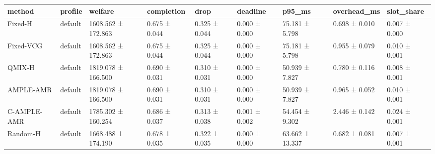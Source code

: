 \begin{tabular}{lllllllll}
\toprule
method & profile & welfare & completion & drop & deadline & p95\_ms & overhead\_ms & slot\_share \\
\midrule
Fixed-H & default & 1608.562 ± 172.863 & 0.675 ± 0.044 & 0.325 ± 0.044 & 0.000 ± 0.000 & 75.181 ± 5.798 & 0.698 ± 0.010 & 0.007 ± 0.000 \\
Fixed-VCG & default & 1608.562 ± 172.863 & 0.675 ± 0.044 & 0.325 ± 0.044 & 0.000 ± 0.000 & 75.181 ± 5.798 & 0.955 ± 0.079 & 0.010 ± 0.001 \\
QMIX-H & default & 1819.078 ± 166.500 & 0.690 ± 0.031 & 0.310 ± 0.031 & 0.000 ± 0.000 & 50.939 ± 7.827 & 0.780 ± 0.116 & 0.008 ± 0.001 \\
AMPLE-AMR & default & 1819.078 ± 166.500 & 0.690 ± 0.031 & 0.310 ± 0.031 & 0.000 ± 0.000 & 50.939 ± 7.827 & 0.965 ± 0.052 & 0.010 ± 0.001 \\
C-AMPLE-AMR & default & 1785.302 ± 160.254 & 0.686 ± 0.037 & 0.313 ± 0.038 & 0.001 ± 0.002 & 54.454 ± 9.302 & 2.446 ± 0.142 & 0.024 ± 0.001 \\
Random-H & default & 1668.488 ± 174.190 & 0.678 ± 0.035 & 0.322 ± 0.035 & 0.000 ± 0.000 & 63.662 ± 13.337 & 0.682 ± 0.081 & 0.007 ± 0.001 \\
\bottomrule
\end{tabular}
